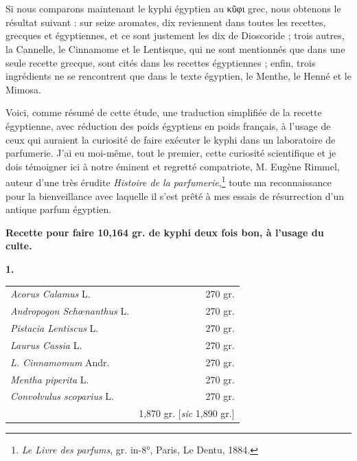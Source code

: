\documentclass[a4paper, 11pt, oneside, landscape]{article}
\begin{document}
\section{}
\paragraph{}
Si nous comparons maintenant le kyphi égyptien au κῦφι grec, nous obtenons le résultat suivant : sur seize aromates, dix reviennent dans toutes les recettes, grecques et égyptiennes, et ce sont justement les dix de Dioscoride ; trois autres, la Cannelle, le Cinnamome et le Lentisque, qui ne sont mentionnés que dans une seule recette grecque, sont cités dans les recettes égyptiennes ; enfin, trois ingrédients ne se rencontrent que dans le texte égyptien, le Menthe, le Henné et le Mimosa.

Voici, comme résumé de cette étude, une traduction simplifiée de la recette égyptienne, avec réduction des poids égyptiens en poids français, à l'usage de ceux qui auraient la curiosité de faire exécuter le kyphi dans un laboratoire de parfumerie. J'ai eu moi-même, tout le premier, cette curiosité scientifique et je dois témoigner ici à notre éminent et regretté compatriote, M. Eugène Rimmel, auteur d'une très érudite \emph{Histoire de la parfumerie},\footnote{\emph{Le Livre des parfums}, gr. in-8°, Paris, Le Dentu, 1884.} toute ma reconnaissance pour la bienveillance avec laquelle il s'est prêté à mes essais de résurrection d'un antique parfum égyptien.

\begin{center}
\textbf{Recette pour faire 10,164 gr. de kyphi deux fois bon, à l'usage du culte.}
\end{center}
\begin{center}
\textbf{1.}
\end{center}
\begin{table}[H]
    \centering
    \begin{tabular}{l r}
        \emph{Acorus Calamus} L.  &  270 gr. \\
        \emph{Andropogon Schœnanthus} L.  &  270 gr. \\
        \emph{Pistacia Lentiscus} L.  &  270 gr. \\
        \emph{Laurus Cassia} L.  &  270 gr. \\
        \emph{L. Cinnamomum} Andr.  &  270 gr. \\
        \emph{Mentha piperita} L.  &  270 gr. \\
        \emph{Convolvulus scoparius} L.  &  270 gr. \\ \hline
        ~ & 1,870 gr. [\emph{sic} 1,890 gr.] \\
    \end{tabular}
\end{table}
\end{document}
